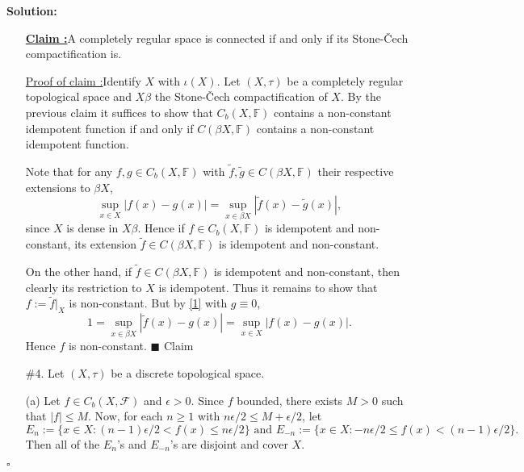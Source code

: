 \documentclass[12pt]{article}
\newcounter{ProofCounter}
\newcounter{ClaimCounter}[ProofCounter]
\newenvironment{Solution}{\stepcounter{ProofCounter}\textbf{Solution:}}{\hfill$\square$}
\newenvironment{claim}[1]{\vspace{1mm}\stepcounter{ClaimCounter}\par\noindent\underline{\bf Claim \theClaimCounter:}\space#1}{}
\newenvironment{claimproof}[1]{\par\noindent\underline{Proof of claim \theClaimCounter:}\space#1}{\hfill $\blacksquare$ Claim \theClaimCounter}
\begin{document}
\begin{Solution}
\begin{enumerate}

      \begin{claim}
        A completely regular space is connected if and only if its Stone-\v{C}ech compactification is.
      \end{claim}
      \begin{claimproof}
        Identify $X$ with $\iota(X)$.
        Let $(X, \tau)$ be a completely regular topological space and $X \beta$ the Stone-\v{C}ech compactification of $X$. 
        By the previous claim it suffices to show that $C_b(X, \mathbb{F})$ contains a non-constant idempotent function if and only if $C(\beta X,
        \mathbb{F})$ contains a non-constant idempotent function.

        Note that for any $f,g \in C_b(X, \mathbb{F})$ with $\tilde{f}, \tilde{g} \in C(\beta X, \mathbb{F})$ their respective extensions to $\beta X$,
        \begin{equation}
          \sup_{x \in X}|f(x) - g(x)| = \sup_{x \in \beta X}|\tilde{f}(x) - \tilde{g}(x)|,
          \label{1}
        \end{equation}
        since $X$ is dense in $X\beta$. Hence if $f \in C_b(X, \mathbb{F})$ is idempotent and non-constant, its extension $\tilde{f} \in C(\beta X, \mathbb{F})$
        is idempotent and non-constant. 
        
        On the other hand, if $\tilde{f} \in C(\beta X, \mathbb{F})$ is idempotent and non-constant, then clearly its restriction to
        $X$ is idempotent. Thus it remains to show that $f := \tilde{f}\big|_{X}$ is non-constant. But by \eqref{1} with $g \equiv 0$,
        \[
          1 = \sup_{x \in \beta X}|\tilde{f}(x) - g(x)| = \sup_{x \in X}|f(x) - g(x)|.
        \]
        Hence $f$ is non-constant.
      \end{claimproof}

    \item[\#4.] Let $(X, \tau)$ be a discrete topological space.

      (a) Let $f \in C_b(X, \mathcal{F})$ and $\epsilon > 0$. Since $f$ bounded, there exists $M > 0$ such that $|f| \leq M$. Now, for each $n \geq 1$
      with $n \epsilon / 2 \leq M + \epsilon / 2$, let 
      \[
        E_n := \{ x \in X : (n - 1)\epsilon / 2 < f(x) \leq n \epsilon / 2\} \text{ and } E_{-n} := \{x \in X : -n \epsilon / 2 \leq f(x) <
        (n-1)\epsilon / 2 \}.
      \]
      Then all of the $E_n$'s and $E_{-n}$'s are disjoint and cover $X$.


\end{enumerate}
\end{Solution}
\end{document}
